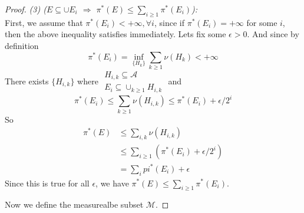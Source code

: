 \begin{proof}
  \emph{(3) ($E\subseteq \cup E_i$ $\Rightarrow$ $\pi^*(E)\leq \sum_{i\geq 1} \pi^*(E_i)$):} \\
  First, we assume that $\pi^*(E_i) < +\infty, \forall i$, since if $\pi^*(E_i) = +\infty$ for some $i$, then the above inequality satisfies immediately.
  Lets fix some $\epsilon > 0$. And since by definition
  \[\pi^*(E_i) = \inf_{\{H_k\}} \sum_{k\geq 1} \nu(H_k) < +\infty\]
  There exists $\{H_{i,k}\}$ where $\substack{H_{i,k}\subseteq \mathcal{A} \\ E_i\subseteq \cup_{k\geq 1} H_{i,k}}$ and
  \[\pi^*(E_i) \leq \sum_{k\geq 1} \nu(H_{i,k}) \leq \pi^*(E_i) + \epsilon/2^i\]
  So
  \begin{align*}
    \pi^*(E) &\leq \sum_{i,k} \nu(H_{i,k}) \\
             &\leq \sum_{i\geq 1} (\pi^*(E_i) + \epsilon/2^i) \\
             &= \sum_{i} pi^*(E_i) + \epsilon 
  \end{align*}
  Since this is true for all $\epsilon$, we have $\pi^*(E) \leq \sum_{i\geq 1} \pi^*(E_i)$.

  Now we define the measurealbe subset $\mathcal{M}$.
\end{proof}

